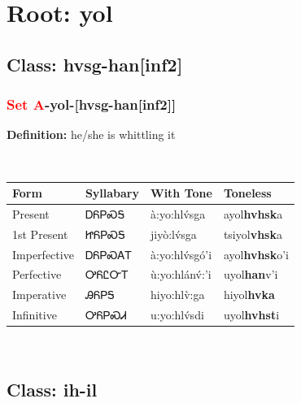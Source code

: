 \needspace{4in}
\section*{Root: yol}
\nopagebreak
{}
\needspace{3in}
\subsection*{Class: hvsg-han[inf2]}
\nopagebreak
\needspace{2in}
\subsubsection*{\textcolor{Red}{Set A}{-}\textbf{yol}{-}[hvsg-han[inf2]]}
\nopagebreak
\textbf{Definition: } he/she is whittling it
\\[0.5em]
\begin{tabularx}{\textwidth}{l X X X}%
\toprule%
\textbf{Form}&\textbf{Syllabary}&\textbf{With Tone}&\textbf{Toneless}\\%
\midrule%
Present&ᎠᏲᏢᏍᎦ&à:yo:hlv́sga&ayol\textbf{hvhsk}a\\%
1st Present&ᏥᏲᏢᏍᎦ&jiyò:lv́sga&tsiyol\textbf{vhsk}a\\%
Imperfective&ᎠᏲᏢᏍᎪᎢ&à:yo:hlv́sgó’i&ayol\textbf{hvhsk}o'i\\%
Perfective&ᎤᏲᏝᏅᎢ&ù:yo:hlánv́:’i&uyol\textbf{han}v'i\\%
Imperative&ᎯᏲᏢᎦ&hiyo:hlv̀:ga&hiyol\textbf{hvka}\\%
Infinitive&ᎤᏲᏢᏍᏗ&u:yo:hlv́sdi&uyol\textbf{hvhst}i\\%
\bottomrule%
\end{tabularx}
\\[1em]
\needspace{3in}
\subsection*{Class: ih-il}
\nopagebreak
\needspace{2in}
